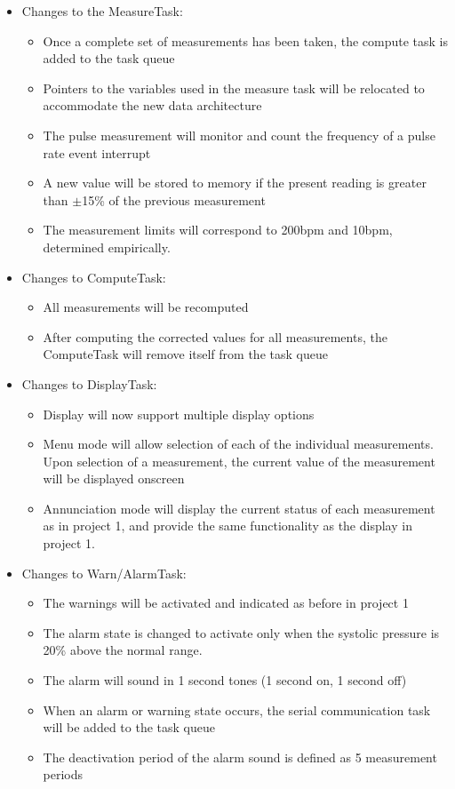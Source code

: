 \documentclass[12pt]{article} %
\begin{document}
\begin{itemize}
  \item Changes to the MeasureTask:
    \begin{itemize}
      \item Once a complete set of measurements has been taken, the compute
	task is added to the task queue
      \item Pointers to the variables used in the measure task will be
	relocated to accommodate the new data architecture
      \item The pulse measurement will monitor and count the frequency of a
	pulse rate event interrupt
      \item A new value will be stored to memory if the present reading is
	greater than $\pm$15\% of the previous measurement
      \item The measurement limits will correspond to 200bpm and 10bpm,
	determined empirically. 
    \end{itemize}

  \item Changes to ComputeTask:
    \begin{itemize}
      \item All measurements will be recomputed
      \item After computing the corrected values for all measurements, the
	ComputeTask will remove itself from the task queue
    \end{itemize}

  \item Changes to DisplayTask:
    \begin{itemize}
      \item Display will now support multiple display options
      \item Menu mode will allow selection of each of the individual
	measurements. Upon selection of a measurement, the current value of the
	measurement will be displayed onscreen
      \item Annunciation mode will display the current status of each
	measurement as in project 1, and provide the same functionality as the
	display in project 1.
    \end{itemize}

  \item Changes to Warn/AlarmTask:
    \begin{itemize}
      \item The warnings will be activated and indicated as before in project 1
      \item The alarm state is changed to activate only when the systolic
	pressure is 20\% above the normal range.
      \item The alarm will sound in 1 second tones (1 second on, 1 second off)
      \item When an alarm or warning state occurs, the serial communication
	task will be added to the task queue
      \item The deactivation period of the alarm sound is defined as 5
	measurement periods
    \end{itemize}


\end{itemize}
\end{document}
